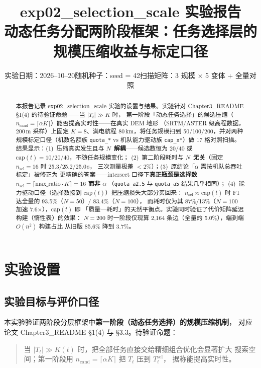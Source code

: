 \documentclass[a4paper,11pt]{article}
\title{\textbf{exp02\_selection\_scale 实验报告}\\[6pt]
\large 动态任务分配两阶段框架：任务选择层的规模压缩收益与标定口径}
\author{}
\date{实验日期：2026--10--20\quad 随机种子：seed = 42\quad 扫描矩阵：3 规模 × 5 变体 + 全量对照}
\begin{document}
\maketitle

\begin{abstract}
\noindent 本报告记录 exp02\_selection\_scale 实验的设置与结果。实验针对
Chapter3\_README \S 1(4) 的待验证命题——当 $|T_t| \gg K$ 时，
第一阶段「动态任务选择」的候选压缩（$n_{\mathrm{cand}}=\lceil\alpha K\rceil$）能否提高实时性——在真实 DEM 地形
（SRTM/ASTER 级高程数据，200\,m 采样）上固定 $K=8$、满电航程
80\,km，将任务规模扫到 50/100/200，并对两种规模标定口径（机数名额族
\texttt{quota\_*} vs 机队能力驱动族 \texttt{cap\_x*}）做 17 格对照扫描。
结果显示：(1)~压缩真实发生且与 $N$~\textbf{解耦}——候选数恒为
20/40 或 $\mathrm{cap}(t)=10/20/40$，不随任务规模变化；
(2)~第二阶段耗时与 $N$~\textbf{无关}（固定 $n_{\mathrm{sel}}=16$ 时 25.3/25.2/25.0\,s，
三次测量极差 $<2\%$）；(3)~原结论「$\alpha$ 需按机队总吞吐标定」被修正为
更精确的答案——intersect 口径下\textbf{真正瓶颈是选择数
$n_{\mathrm{sel}}=\lceil \mathrm{max\_ratio}\cdot K \rceil = 16$ 而非 $\alpha$}
（\texttt{quota\_a2.5} 与 \texttt{quota\_a5} 结果几乎相同）；
(4)~能力驱动口径（选择数接到 $\mathrm{cap}(t)$）把压缩损失大部分买回来：
$n_{\mathrm{sel}} \approx \mathrm{cap}(t)$ 时 F1 达全量的 93.5\%（$N{=}50$）/ 83.4\%（$N{=}100$），
而耗时仅为其 87\%/13\%（$N{=}100$ 加速 7.6$\times$），$\mathrm{cap}(t)$ 即
「质量—耗时」的天然平衡点。实验同时验证了代价矩阵延迟构建（惰性表）的效果：
$N{=}200$ 时一阶段仅现算 2,164 条边（全量的 5.0\%），端到端 $O(n^2)$ 构建占比
从旧版 85.6\% 降到 3.7\%。
\end{abstract}

\tableofcontents
\newpage

\section{实验设置}

\subsection{实验目标与评价口径}

本实验验证两阶段分层框架中\textbf{第一阶段（动态任务选择）的规模压缩机制}，
对应论文 Chapter3\_README \S 1(4) 与 \S 3.3。待验证命题：

\begin{quote}
当 $|T_t| \gg K(t)$ 时，把全部任务直接交给精细组合优化会显著扩大
搜索空间；第一阶段用 $n_{\mathrm{cand}}=\lceil\alpha K\rceil$ 把 $T_t$ 压到 $T_t^{\mathrm{sel}}$，
据称能提高实时性。
\end{quote}
\end{document}
